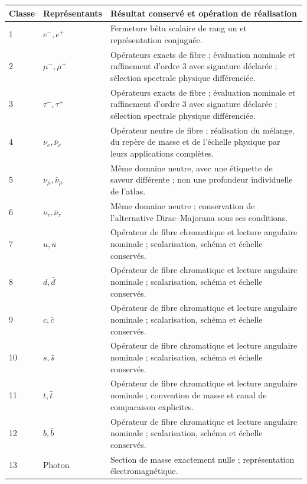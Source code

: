 \begin{table}[!htbp]
\centering\fontsize{9.2}{10.5}\selectfont
\setlength{\tabcolsep}{4pt}\renewcommand{\arraystretch}{1.04}
\begin{tabular}{@{}p{.11\linewidth}p{.20\linewidth}p{.62\linewidth}@{}}
 \toprule
 Classe
&Représentants
&Résultat conservé et opération de réalisation
\\
 \midrule
 
 1&\(e^-,e^+\)&Fermeture bêta scalaire de rang un et représentation conjuguée.
\\
 2&\(\mu^-,\mu^+\)&Opérateurs exacts de fibre ; évaluation nominale et raffinement d’ordre \(3\) avec signature déclarée ; sélection spectrale physique différenciée.
\\
 3&\(\tau^-,\tau^+\)&Opérateurs exacts de fibre ; évaluation nominale et raffinement d’ordre \(3\) avec signature déclarée ; sélection spectrale physique différenciée.
\\
 4&\(\nu_e,\bar\nu_e\)&Opérateur neutre de fibre ; réalisation du mélange, du repère de masse et de l’échelle physique par leurs applications complètes.
\\
 5&\(\nu_\mu,\bar\nu_\mu\)&Même domaine neutre, avec une étiquette de saveur différente ; non une profondeur individuelle de l’atlas.
\\
 6&\(\nu_\tau,\bar\nu_\tau\)&Même domaine neutre ; conservation de l’alternative Dirac--Majorana sous ses conditions.
\\
 7&\(u,\bar u\)&Opérateur de fibre chromatique et lecture angulaire nominale ; scalarisation, schéma et échelle conservés.
\\
 8&\(d,\bar d\)&Opérateur de fibre chromatique et lecture angulaire nominale ; scalarisation, schéma et échelle conservés.
\\
 9&\(c,\bar c\)&Opérateur de fibre chromatique et lecture angulaire nominale ; scalarisation, schéma et échelle conservés.
\\
 10&\(s,\bar s\)&Opérateur de fibre chromatique et lecture angulaire nominale ; scalarisation, schéma et échelle conservés.
\\
 11&\(t,\bar t\)&Opérateur de fibre chromatique et lecture angulaire nominale ; convention de masse et canal de comparaison explicites.
\\
 12&\(b,\bar b\)&Opérateur de fibre chromatique et lecture angulaire nominale ; scalarisation, schéma et échelle conservés.
\\
 13&Photon
&Section de masse exactement nulle ; représentation électromagnétique.

\end{tabular}
\end{table}
